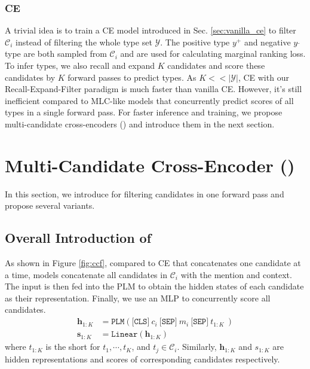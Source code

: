 \subsubsection{CE} A trivial idea is to train a CE model introduced in Sec. \ref{sec:vanilla_ce} to filter $\mathcal{C}_i$ instead of filtering the whole type set $\mathcal{Y}$. The positive type $y^{+}$ and negative $y^{\_}$ type are both sampled from $\mathcal{C}_{i}$ and are used for calculating marginal ranking loss. To infer types, we also recall and expand $K$ candidates and score these candidates by $K$ forward passes to predict types. As $K << |\mathcal{Y}|$, CE with our Recall-Expand-Filter paradigm is much faster than vanilla CE. However, it's still inefficient compared to MLC-like models that concurrently predict scores of all types in a single forward pass. For faster inference and training, we propose multi-candidate cross-encoders ({\bf \textsc{\name}}) and introduce them in the next section.

\section{Multi-Candidate Cross-Encoder (\name)}
\label{sec:ccf}
 In this section, we introduce {\bf \textsc{\name}} for filtering candidates in one forward pass and propose several variants. 
\subsection{Overall Introduction of \name}
As shown in Figure \ref{fig:ccf}, compared to CE that concatenates one candidate at a time, {\bf \textsc{\name}} models concatenate all candidates in $\mathcal{C}_i$ with the mention and context. The input is then fed into the PLM to obtain the hidden states of each candidate as their representation. Finally, we use an MLP to concurrently score all candidates.
\begin{equation}
\begin{aligned}
\bm{h}_{1:K}  &= \texttt{PLM}(\texttt{[CLS]} \ c_i \ \texttt{[SEP]}\  m_i \ \texttt{[SEP]} \ t_{1:K} \ )  \\
\bm{s}_{1:K}  &= \texttt{Linear}(\bm{h}_{1:K}) 
\end{aligned}
\end{equation}
where $t_{1:K}$ is the short for $t_1, \cdots, t_K$, and $t_j \in \mathcal{C}_i$. Similarly, $\bm{h}_{1:K}$ and $s_{1:K}$ are hidden representations and scores of corresponding candidates respectively. 

